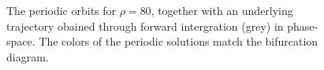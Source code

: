 \begin{figure}
\centering{}
\caption{
	The periodic orbits for $\rho=80$, together with an underlying trajectory obained through forward intergration (grey) in phase-space. 
	The colors of the periodic solutions match the bifurcation diagram.
}
\label{fig:lorenzcut}
\end{figure}

\restoregeometry
